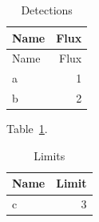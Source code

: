 \documentclass{pasj00}
\begin{document}
\begin{longtable}{lr}
\caption{Detections}\label{t:det}
\hline
Name & Flux \\
\hline
\endfirsthead
\hline
Name & Flux \\
\hline
\endhead
\hline
\endfoot
a & 1 \\
b & 2 \\
\end{longtable}
Table~\ref{t:det}.
\begin{longtable}{lr}
\caption{Limits}\\
\hline
Name & Limit \\
\hline
\endhead
c & 3 \\
\end{longtable}
\end{document}
